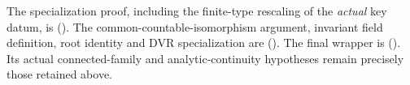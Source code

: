The specialization proof, including the finite-type
rescaling of the \emph{actual} key datum, is
().
The common-countable-isomorphism argument, invariant field
definition, root identity and DVR specialization are
().
The final wrapper is
().
Its actual connected-family and analytic-continuity
hypotheses remain precisely those retained above.
